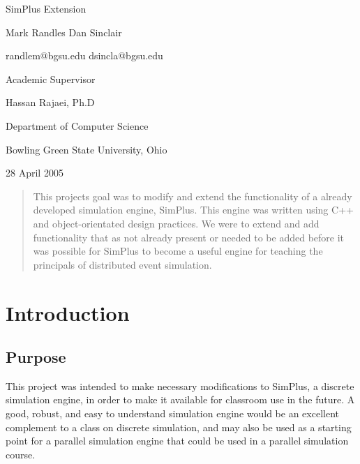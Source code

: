 \documentclass[12pt]{report}
\newcommand{\mychapter}[1]{\chapter{#1} \label{ch:#1} \thispagestyle{fancy}}
\begin{document}
\begin{titlepage}
\vspace{4cm}
\begin{center}
    \huge SimPlus Extension
\end{center}
\vspace{1.0cm}

\vspace{1cm}

\vspace {1cm}
\centerline{\large Mark Randles \hfill Dan Sinclair}
\vspace{0.2cm}
\centerline{randlem@bgsu.edu \hfill dsincla@bgsu.edu }
\vspace {1cm}
\centerline{Academic Supervisor}
\centerline{Hassan Rajaei, Ph.D}

\vspace{1cm}
\centerline{\large Department of Computer Science}
\vspace{0.2cm}
\centerline{\large Bowling Green State University, Ohio}
\vspace{0.2cm}
\centerline{\large 28 April 2005}

\clearpage
\end{titlepage}

\begin{abstract}
This projects goal was to modify and extend the functionality of a already developed simulation engine, SimPlus.  This engine was written using C++ and object-orientated design practices.  We were to extend and add functionality that as not already present or needed to be added before it was possible for SimPlus to become a useful engine for teaching the principals of distributed event simulation.
\end{abstract}

\tableofcontents
\newpage

\mychapter{Introduction}
\section{Purpose}
	This project was intended to make necessary modifications to SimPlus, a discrete simulation engine, in order to make it available for classroom use in the future.  A good, robust, and easy to understand simulation engine would be an excellent complement to a class on discrete simulation, and may also be used as a starting point for a parallel simulation engine that could be used in a parallel simulation course.
\end{document}
